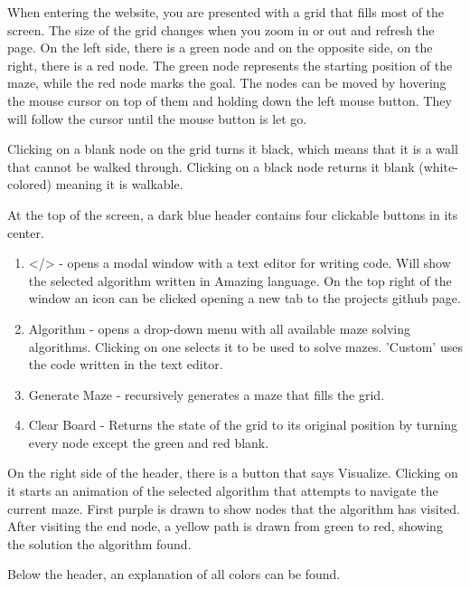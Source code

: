 When entering the website, you are presented with a grid that fills most of the screen. The size of the grid changes when you zoom in or out and refresh the page. On the left side, there is a green node and on the opposite side, on the right, there is a red node. The green node represents the starting position of the maze, while the red node marks the goal. The nodes can be moved by hovering the mouse cursor on top of them and holding down the left mouse button. They will follow the cursor until the mouse button is let go.

Clicking on a blank node on the grid turns it black, which means that it is a wall that cannot be walked through. Clicking on a black node returns it blank (white-colored) meaning it is walkable.

At the top of the screen, a dark blue header contains four clickable buttons in its center. 

\begin{enumerate}
    \item </> - opens a modal window with a text editor for writing code. Will show the selected algorithm written in Amazing language. On the top right of the window an icon can be clicked opening a new tab to the projects github page.
    \item Algorithm - opens a drop-down menu with all available maze solving algorithms. Clicking on one selects it to be used to solve mazes. 'Custom' uses the code written in the text editor.
    \item Generate Maze -  recursively generates a maze that fills the grid.
    \item Clear Board - Returns the state of the grid to its original position by turning every node except the green and red blank. 
\end{enumerate}

On the right side of the header, there is a button that says Visualize. Clicking on it starts an animation of the selected algorithm that attempts to navigate the current maze. First purple is drawn to show nodes that the algorithm has visited.  After visiting the end node, a yellow path is drawn from green to red, showing the solution the algorithm found. 

Below the header, an explanation of all colors can be found.